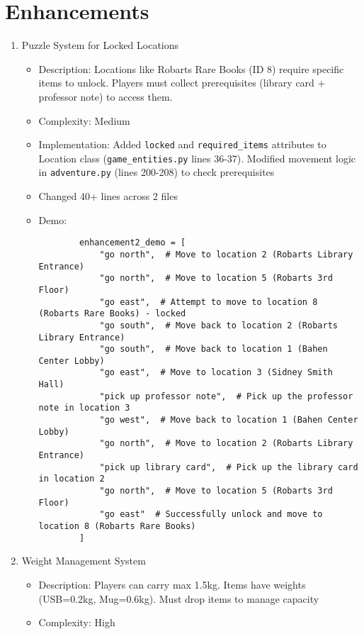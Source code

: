 \documentclass[11pt]{article}
\begin{document}
\section*{Enhancements}
\begin{enumerate}
    \item Puzzle System for Locked Locations
    \begin{itemize}
        \item Description: Locations like Robarts Rare Books (ID 8) require specific items to unlock. Players must collect prerequisites (library card + professor note) to access them.
        \item Complexity: Medium
        \item Implementation: Added \texttt{locked} and \texttt{required\_items} attributes to Location class (\texttt{game\_entities.py} lines 36-37). Modified movement logic in \texttt{adventure.py} (lines 200-208) to check prerequisites
        \item Changed 40+ lines across 2 files
        \item Demo:
        \begin{verbatim}
        enhancement2_demo = [
            "go north",  # Move to location 2 (Robarts Library Entrance)
            "go north",  # Move to location 5 (Robarts 3rd Floor)
            "go east",  # Attempt to move to location 8 (Robarts Rare Books) - locked
            "go south",  # Move back to location 2 (Robarts Library Entrance)
            "go south",  # Move back to location 1 (Bahen Center Lobby)
            "go east",  # Move to location 3 (Sidney Smith Hall)
            "pick up professor note",  # Pick up the professor note in location 3
            "go west",  # Move back to location 1 (Bahen Center Lobby)
            "go north",  # Move to location 2 (Robarts Library Entrance)
            "pick up library card",  # Pick up the library card in location 2
            "go north",  # Move to location 5 (Robarts 3rd Floor)
            "go east"  # Successfully unlock and move to location 8 (Robarts Rare Books)
        ]
        \end{verbatim}
    \end{itemize}
    \item Weight Management System
    \begin{itemize}
        \item Description: Players can carry max 1.5kg. Items have weights (USB=0.2kg, Mug=0.6kg). Must drop items to manage capacity
        \item Complexity: High

\end{itemize}
\end{enumerate}
\end{document}
